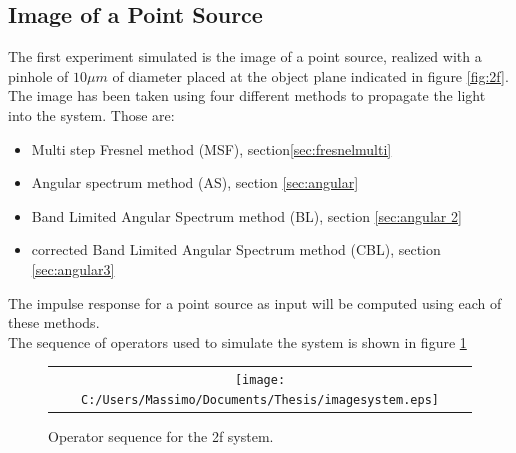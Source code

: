 	 \subsection{Image of a Point Source}
	 The first experiment simulated is the image of a point source, realized with a pinhole of $10 \mu m$ of diameter placed at the object plane indicated in figure \ref{fig:2f}. The image has been taken using four different methods to propagate the light into the system. Those are:
	 \begin{itemize}
	 	\item Multi step Fresnel method (MSF), section\ref{sec:fresnelmulti}
	 	\item Angular spectrum method (AS), section \ref{sec:angular}
	 	\item Band Limited Angular Spectrum method (BL), section \ref{sec:angular 2}
	 	\item corrected Band Limited Angular Spectrum method (CBL), section \ref{sec:angular3}
	 		 \end{itemize}
The impulse response for a point source as input will be computed using each of these methods.\\
 The sequence of operators used to simulate the system is shown in figure \ref{fig:sequence2} \\
	 \begin{figure}[H]
	 	\begin{center}
	 		\begin{tabular}{c}
	 			\texttt{[image: C:/Users/Massimo/Documents/Thesis/imagesystem.eps]}
	 		\end{tabular}
	 	\end{center}
	 	\caption{ \label{fig:sequence2} 
	 		Operator sequence for the 2f system. }
	 \end{figure} 
	 

